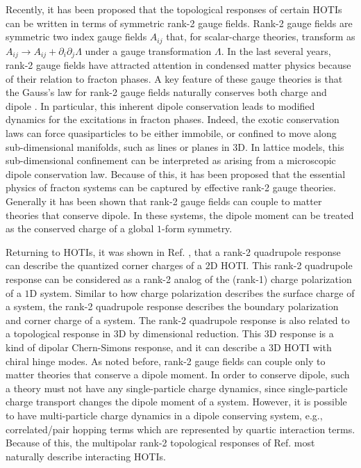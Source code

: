 \documentclass[prb,aps,twocolumn,groupaddress,floatfix]{revtex4-1}
\begin{document}
Recently, it has been proposed that the topological responses of certain HOTIs can be written in terms of symmetric rank-2 gauge fields\cite{you2019}. Rank-2 gauge fields are symmetric two index gauge fields $A_{ij}$ that, for scalar-charge theories, transform as $A_{ij} \rightarrow A_{ij} + \partial_i \partial_j \Lambda$ under a gauge transformation $\Lambda$. In the last several years, rank-2 gauge fields have attracted attention in condensed matter physics because of their relation to fracton phases\cite{nandkishore2019fractons,pretko2020fracton}. A key feature of these gauge theories is that the Gauss's law for rank-2 gauge fields naturally conserves both charge and dipole \cite{pretko2017a, pretko2017b, pretko2018b}. In particular, this inherent dipole conservation leads to modified dynamics for the excitations in fracton phases\cite{nandkishore2019, haah2011, vijay2016, hsieh2017, pretko2017, ma2018, gromov2019}. Indeed, the exotic conservation laws can force  quasiparticles to be either immobile, or confined to move along sub-dimensional manifolds, such as lines or planes in $3$D. In lattice models, this sub-dimensional confinement can be interpreted as arising from a microscopic dipole conservation law\cite{xu2006novel, xu2010emergent, pretko2017}. Because of this, it has been proposed that the essential physics of fracton systems can be captured by effective rank-2 gauge theories. Generally it has been shown that rank-2 gauge fields can couple to matter theories that conserve dipole\cite{pretko2018}. In these systems, the dipole moment can be treated as the conserved charge of a global $1$-form symmetry\cite{seiberg2019, seiberg2020, dubinkin2020c}. 

Returning to HOTIs, it was shown in Ref. , that a rank-2 quadrupole response can describe the quantized corner charges of a $2$D HOTI. This rank-2 quadrupole response can be considered as a rank-2 analog of the (rank-1) charge polarization of a $1$D system\cite{qi2011topological}. Similar to how charge polarization describes the surface charge of a system, the rank-2 quadrupole response describes the boundary polarization and corner charge of a system.  The rank-2 quadrupole response is also related to a topological response in $3$D by dimensional reduction. This $3$D response is a kind of dipolar Chern-Simons response\cite{you2019}, and it can describe a $3$D HOTI with chiral hinge modes. As noted before, rank-2 gauge fields can couple only to matter theories that conserve a dipole moment. In order to conserve dipole, such a theory must not have any single-particle charge dynamics, since single-particle charge transport changes the dipole moment of a system. However, it is possible to have multi-particle charge dynamics in a dipole conserving system, e.g., correlated/pair hopping terms which are represented by quartic interaction terms. Because of this, the multipolar rank-2 topological responses of Ref.  most naturally describe interacting HOTIs. 
\end{document}
